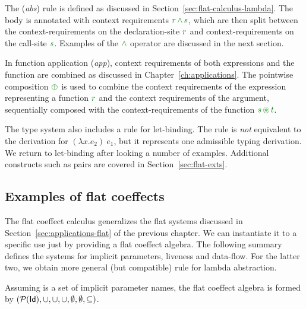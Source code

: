 The (\emph{abs}) rule is defined as discussed in Section~\ref{sec:flat-calculus-lambda}. The
body is annotated with context requirements $\cclrd{r} \,\czip\, \cclrd{s}$, which are then split
between the context-requirements on the declaration-site $\cclrd{r}$ and context-requirements on
the call-site $\cclrd{s}$. Examples of the $\czip$ operator are discussed in the next section.

In function application (\emph{app}), context requirements of both expressions and the 
function are combined as discussed in Chapter~\ref{ch:applications}. The pointwise composition
$\cpar$ is used to combine the context requirements of the expression representing a function 
$\cclrd{r}$ and the context requirements of the argument, sequentially composed with the 
context-requirements of the function $\cclrd{s}\, \cseq \,\cclrd{t}$.

The type system also includes a rule for let-binding. The rule is \emph{not} equivalent to the
derivation for $(\lambda x.e_2)~e_1$, but it represents one admissible typing derivation. We
return to let-binding after looking a number of examples. Additional constructs such 
as pairs are covered in Section~\ref{sec:flat-exts}.


\subsection{Examples of flat coeffects}
\label{sec:flat-calculus-examples}

The flat coeffect calculus generalizes the flat systems discussed in 
Section~\ref{sec:applications-flat} of the previous chapter. We can instantiate it to a specific
use just by providing a flat coeffect algebra. The following summary defines the systems for implicit 
parameters, liveness and data-flow. For the latter two, we obtain more general (but compatible) rule 
for lambda abstraction.

\begin{example}
Assuming  is a set of implicit parameter names, the flat coeffect algebra 
is formed by $(\mathcal{P}(\textnormal{\sffamily Id}), \cup, \cup, \cup, \emptyset, \emptyset, \subseteq)$.
\end{example}

